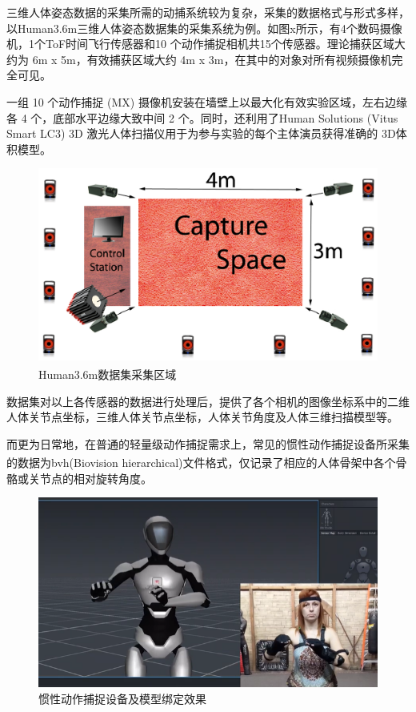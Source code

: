 三维人体姿态数据的采集所需的动捕系统较为复杂，采集的数据格式与形式多样，以Human3.6m三维人体姿态数据集的采集系统为例。如图x所示，有4个数码摄像机，1个ToF时间飞行传感器和10 个动作捕捉相机共15个传感器。理论捕获区域大约为 6m x 5m，有效捕获区域大约 4m x 3m，在其中的对象对所有视频摄像机完全可见。

一组 10 个动作捕捉 (MX) 摄像机安装在墙壁上以最大化有效实验区域，左右边缘各 4 个，底部水平边缘大致中间 2 个。同时，还利用了Human Solutions (Vitus Smart LC3) 3D 激光人体扫描仪用于为参与实验的每个主体演员获得准确的 3D体积模型。

\begin{figure}[h]
	\centering
	\includegraphics[scale=0.4]{figures/13.png}
	\caption{Human3.6m数据集采集区域\textsuperscript{\cite{p27}}}
	\label{fig:f13}
\end{figure}

数据集对以上各传感器的数据进行处理后，提供了各个相机的图像坐标系中的二维人体关节点坐标，三维人体关节点坐标，人体关节角度及人体三维扫描模型等。

而更为日常地，在普通的轻量级动作捕捉需求上，常见的惯性动作捕捉设备所采集的数据为bvh(Biovision hierarchical)文件格式\textsuperscript{\cite{p19}}，仅记录了相应的人体骨架中各个骨骼或关节点的相对旋转角度。

\begin{figure}[h]
	\centering
	\includegraphics[scale=0.8]{figures/14.png}
	\caption{惯性动作捕捉设备及模型绑定效果}
	\label{fig:f14}
\end{figure}


